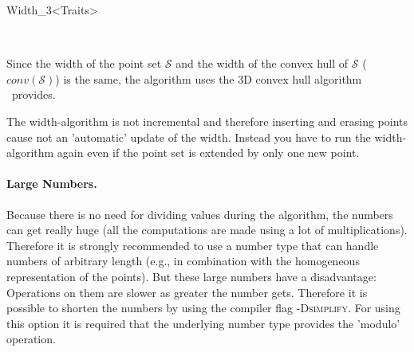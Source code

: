 \begin{ccRefClass}{Width_3<Traits>}
\begin{ccIndexMemberFunctions}



\end{ccIndexMemberFunctions}

\ccSeeAlso

\\[1ex]

\ccImplementation
\ccIndexImplementation

Since the width of the point set $\mathcal{S}$ and the width of the convex
hull of $\mathcal{S}$ ($\mathit{conv(\mathcal{S})}$) is the same, the
algorithm uses the 3D convex hull algorithm \cgal\ provides.

The width-algorithm is not incremental and therefore inserting and
erasing points cause not an 'automatic' update of the width. Instead
you have to run the width-algorithm again even if the point set is
extended by only one new point.

\begin{ccAdvanced}

\paragraph{Large Numbers.}

Because there is no need for dividing values during the algorithm, the
numbers can get really huge (all the computations are made using a lot
of multiplications).  Therefore it is strongly recommended to use a
number type that can handle numbers of arbitrary length (e.g.,
 in combination with the homogeneous representation
of the points). But these large numbers have a disadvantage:
Operations on them are slower as greater the number gets. Therefore it
is possible to shorten the numbers by using the compiler flag
\textsc{-Dsimplify}. For using this option it is required that
the underlying number type provides the 'modulo' operation. 


\end{ccAdvanced}
\end{ccRefClass}
